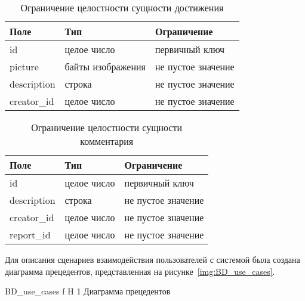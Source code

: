 \begin{table}[htbp]
	\centering
	\caption{Ограничение целостности сущности достижения}
	\begin{tabularx}{\textwidth}{|X|X|X|}
		\hline
		Поле & Тип & Ограничение \\
		\hline
		id & целое число & первичный ключ\\
		\hline
		picture & байты изображения &  не пустое значение\\
		\hline
		description & строка & не пустое значение\\
		\hline
		creator\_id & целое число & не пустое значение\\
		\hline
	\end{tabularx}
	\label{t:achievment_cons}
\end{table}

\begin{table}[htbp]
	\centering
	\caption{Ограничение целостности сущности комментария}
	\begin{tabularx}{\textwidth}{|X|X|X|}
		\hline
		Поле & Тип & Ограничение \\
		\hline
		id & целое число & первичный ключ\\
		\hline
		description & строка & не пустое значение\\
		\hline
		creator\_id & целое число & не пустое значение\\
		\hline
		report\_id & целое число & не пустое значение\\
		\hline
	\end{tabularx}
	\label{t:comment_cons}
\end{table}



Для описания сценариев взаимодействия пользователей с системой была создана диаграмма прецедентов, представленная на рисунке~\ref{img:BD_use_cases}.

{BD_use_cases} %
{f} %
{H} %
{1\textwidth} %
{Диаграмма прецедентов} %


